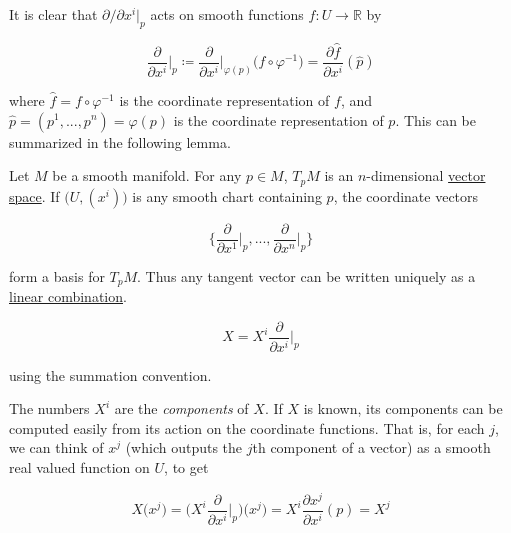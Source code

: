 \documentclass{article}
\begin{document}
    It is clear that $\partial / \partial x^i \big|_p $ acts on smooth functions $f: U \to \mathbb{R}$ by

      \begin{equation}
        \frac{\partial}{\partial x^i} \bigg|_p \coloneqq \frac{\partial}{\partial x^i} \bigg|_{\varphi(p)} \big( f \circ \varphi^{-1} \big) = \frac{\partial \hat{f}}{\partial x^i} (\hat{p})
      \end{equation}

    where $\hat{f} = f \circ \varphi^{-1}$ is the coordinate representation of $f$, and $\hat{p} = (p^1, ..., p^n) = \varphi(p)$ is the coordinate representation of $p$. This can be summarized in the following lemma. 

    \begin{lemma}
      \label{thm:dimension-and-coordinate-basis-of-tpm}
      Let $M$ be a smooth manifold. For any $p \in M$, $T_p M$ is an $n$-dimensional \hyperref[lin-def:vector-space]{vector space}. If $\big( U, (x^i)\big)$ is any smooth chart containing $p$, the coordinate vectors 

        \begin{equation}
          \bigg\{ \frac{\partial}{\partial x^1} \bigg|_p, ..., \frac{\partial}{\partial x^n} \bigg|_p \bigg\}
        \end{equation}

      form a basis for $T_p M$. Thus any tangent vector can be written uniquely as a \hyperref[lin-def:linear-combination]{linear combination}. 

        \begin{equation}
          X = X^i \frac{\partial}{\partial x^i} \bigg|_p
        \end{equation}

      using the summation convention. 
    \end{lemma}

    The numbers $X^i$ are the \textit{components} of $X$. If $X$ is known, its components can be computed easily from its action on the coordinate functions. That is, for each $j$, we can think of $x^j$ (which outputs the $j$th component of a vector) as a smooth real valued function on $U$, to get

      \begin{equation}
        X \big(x^j\big) = \bigg(X^i \frac{\partial}{\partial x^i} \bigg|_p \bigg) \big(x^j \big) = X^i \frac{\partial x^j}{\partial x^i} (p) = X^j
      \end{equation}
\end{document}
